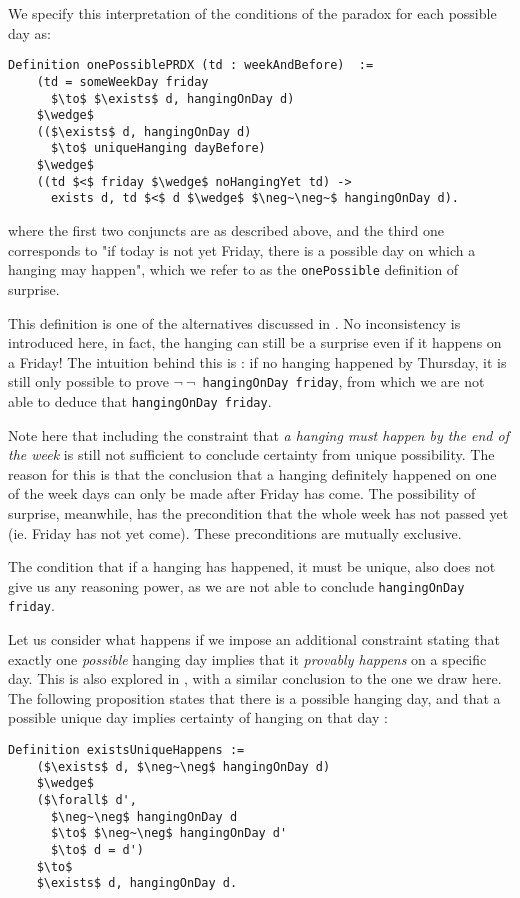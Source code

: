 \documentclass[journal]{journal}
\begin{document}
We specify this interpretation
of the conditions of the paradox for each possible day as:

\begin{lstlisting}[mathescape=true]
  Definition onePossiblePRDX (td : weekAndBefore)  :=
    (td = someWeekDay friday
      $\to$ $\exists$ d, hangingOnDay d)
    $\wedge$
    (($\exists$ d, hangingOnDay d)
      $\to$ uniqueHanging dayBefore)
    $\wedge$
    ((td $<$ friday $\wedge$ noHangingYet td) ->
      exists d, td $<$ d $\wedge$ $\neg~\neg~$ hangingOnDay d).
\end{lstlisting}

where the first two conjuncts are as described above, and
the third one corresponds to "if today is not
  yet Friday, there is a possible day on which a hanging may happen", which
  we refer to as the {\tt onePossible} definition of surprise.

This definition is one of the alternatives discussed in \cite{fourpossible}. No inconsistency
is introduced here, in fact, the hanging can still be a surprise even if it
happens on a Friday! The intuition behind this is : if no hanging happened by
Thursday, it is still only possible to prove {\tt $\neg~\neg$~hangingOnDay friday},
from which we are not able to deduce that {\tt hangingOnDay friday}.

Note here that including the constraint that \emph{a hanging must happen
by the end of the week} is still not sufficient to conclude certainty
from unique possibility. The reason for this is that the conclusion that
a hanging definitely happened on one of the week days can only be made
after Friday has come. The possibility of surprise, meanwhile, has the
precondition that the whole week has not passed yet (ie. Friday has not yet come).
These preconditions are mutually exclusive.

The condition that if a hanging has happened, it must be unique, also does not
give us any reasoning power, as we are not able to conclude {\tt hangingOnDay friday}.

Let us consider what happens if we impose an additional constraint stating that
exactly one \emph{possible} hanging
day implies that it \emph{provably happens} on a specific day. This is also explored in
\cite{fourpossible}, with a similar conclusion to the one we draw here. The following
proposition states that there is a possible hanging day, and that a possible
unique day implies certainty of hanging on that day :

\begin{lstlisting}[mathescape=true]
  Definition existsUniqueHappens :=
    ($\exists$ d, $\neg~\neg$ hangingOnDay d)
    $\wedge$
    ($\forall$ d',
      $\neg~\neg$ hangingOnDay d
      $\to$ $\neg~\neg$ hangingOnDay d'
      $\to$ d = d')
    $\to$
    $\exists$ d, hangingOnDay d.
\end{lstlisting}
\end{document}
